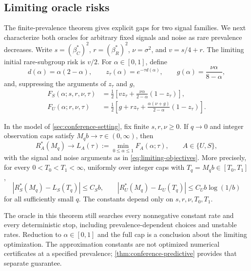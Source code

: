 \subsection{Limiting oracle risks}
\label{sec:oracle-limits}

The finite-prevalence theorem gives explicit gaps for two signal families. We
next characterize both oracles for arbitrary fixed signals and noise as rare
prevalence decreases. Write $s=(\beta_C^*)^2$, $r=(\beta_R^*)^2$,
$\nu=\sigma^2$, and $v=s/4+r$. The limiting initial rare-subgroup risk is $v/2$.
For $\alpha\in[0,1]$, define
\[
  d(\alpha)=\alpha(2-\alpha),\qquad
  z_\tau(\alpha)=e^{-\tau d(\alpha)},\qquad
  g(\alpha)=\frac{\nu\alpha}{8-\alpha},
\]
and, suppressing the arguments of $z_\tau$ and $g$,
\begin{equation}
  \begin{aligned}
    F_S(\alpha;s,r,\nu,\tau)
      &=\frac12\left[vz_\tau+
        \frac{\nu\alpha}{2-\alpha}(1-z_\tau)\right],\\
    F_U(\alpha;r,\nu,\tau)
      &=\frac12\left[g+rz_\tau+
        \frac{\alpha(\nu+g)}{2-\alpha}(1-z_\tau)\right].
  \end{aligned}
  \label{eq:limiting-objectives}
\end{equation}

\begin{theorem}
  \label{thm:oracle-limits}
  In the model of \cref{sec:conference-setting}, fix finite $s,r,\nu\geq0$.
  If $q\to0$ and integer observation caps satisfy
  $M_qb\to\tau\in(0,\infty)$, then
  \[
    R_A^*(M_q)\longrightarrow L_A(\tau)
      :=\min_{0\leq\alpha\leq1}F_A(\alpha;\tau),
      \qquad A\in\{U,S\},
  \]
  with the signal and noise arguments as in \cref{eq:limiting-objectives}.
  More precisely, for every $0<T_0<T_1<\infty$, uniformly over integer caps
  with $T_q=M_qb\in[T_0,T_1]$,
  \begin{equation}
    |R_S^*(M_q)-L_S(T_q)|\leq C_Sb,\qquad
    |R_U^*(M_q)-L_U(T_q)|\leq C_Ub\log(1/b)
    \label{eq:oracle-limit-errors}
  \end{equation}
  for all sufficiently small $q$. The constants depend only on
  $s,r,\nu,T_0,T_1$.
\end{theorem}

The oracle in this theorem still searches every nonnegative constant rate and
every deterministic stop, including prevalence-dependent choices and unstable
rates. Reduction to $\alpha\in[0,1]$ and the full cap is a conclusion about the
limiting optimization. The approximation constants are not optimized numerical
certificates at a specified prevalence; \cref{thm:conference-predictive}
provides that separate guarantee.

